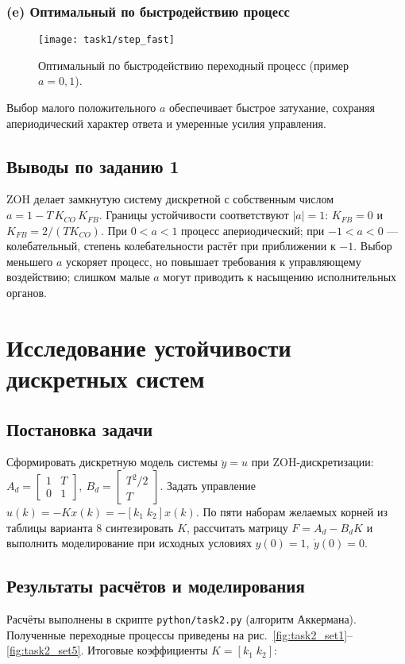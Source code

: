 \subsection*{(e) Оптимальный по быстродействию процесс}
\begin{figure}[H]
  \centering
  \texttt{[image: task1/step\_fast]}
  \caption{Оптимальный по быстродействию переходный процесс (пример \(a=0{,}1\)).}
  \label{fig:task1_fast}
\end{figure}
Выбор малого положительного \(a\) обеспечивает быстрое затухание, сохраняя апериодический характер ответа и умеренные усилия управления.

\section{Выводы по заданию 1}
ZOH делает замкнутую систему дискретной с собственным числом \(a=1-T\,K_{CO}\,K_{FB}\). Границы устойчивости соответствуют \(|a|=1\): \(K_{FB}=0\) и \(K_{FB}=2/(T K_{CO})\). При \(0<a<1\) процесс апериодический; при \(-1<a<0\) — колебательный, степень колебательности растёт при приближении к \(-1\). Выбор меньшего \(a\) ускоряет процесс, но повышает требования к управляющему воздействию; слишком малые \(a\) могут приводить к насыщению исполнительных органов.

\chapter{Исследование устойчивости дискретных систем}
\section{Постановка задачи}
Сформировать дискретную модель системы \(\ddot{y} = u\) при ZOH-дискретизации: \(A_d=\begin{bmatrix}1 & T\\0 & 1\end{bmatrix},\ B_d=\begin{bmatrix}T^2/2\\T\end{bmatrix}\). Задать управление \(u(k)=-Kx(k)=-[k_1\;k_2]x(k)\). По пяти наборам желаемых корней из таблицы варианта 8 синтезировать \(K\), рассчитать матрицу \(F=A_d-B_dK\) и выполнить моделирование при исходных условиях \(y(0)=1,\ \dot{y}(0)=0\).

\section{Результаты расчётов и моделирования}
Расчёты выполнены в скрипте \texttt{python/task2.py} (алгоритм Аккермана). Полученные переходные процессы приведены на рис.~\ref{fig:task2_set1}–\ref{fig:task2_set5}. Итоговые коэффициенты \(K=[k_1\;k_2]\):

